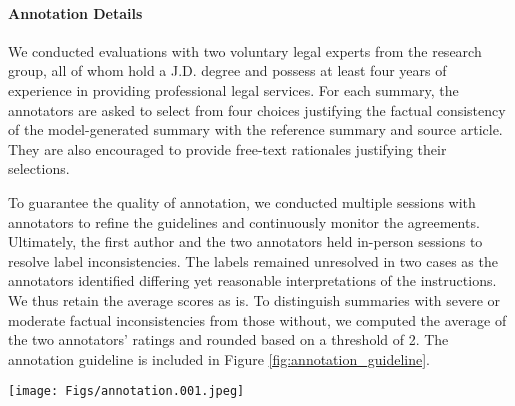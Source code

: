 \paragraph{Annotation Details}
We conducted evaluations with two voluntary legal experts from the research group, all of whom hold a J.D. degree and
possess at least four years of experience
in providing professional legal services. For each summary, the annotators are asked to select from four choices justifying the factual consistency of the model-generated summary with the reference summary and source article. They are also encouraged to provide free-text rationales justifying their selections.

To guarantee the quality of annotation, we conducted multiple
sessions with annotators to refine the guidelines and continuously monitor the agreements. Ultimately, the first author and the two annotators held in-person sessions to resolve label inconsistencies. The labels remained unresolved in two cases as the annotators identified differing yet reasonable interpretations of the instructions.  We thus retain the average scores as is. To distinguish summaries with severe or moderate factual inconsistencies from those without, we computed the average of the two annotators' ratings and rounded based on a threshold of 2.
The annotation guideline is included in Figure \ref{fig:annotation_guideline}.

\begin{figure*}
    \centering
    \texttt{[image: Figs/annotation.001.jpeg]}
    \caption{The annotation interface for LegalSumm. The left panel displays the instructions and the content to be annotated. Annotators are then prompted to select one of four options, as shown in the right panel.}
    \label{fig:annotation_guideline}
\end{figure*}

